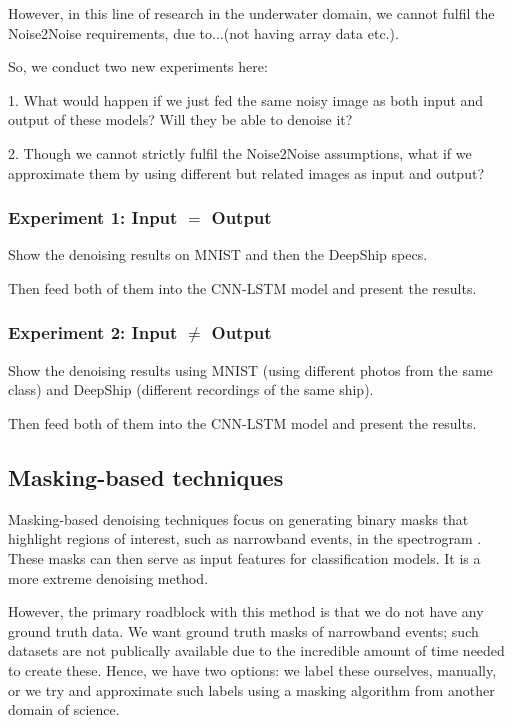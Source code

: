 However, in this line of research in the underwater domain, we cannot fulfil the Noise2Noise requirements, due to...(not having array data etc.). 

So, we conduct two new experiments here:

1. What would happen if we just fed the same noisy image as both input and output of these models? Will they be able to denoise it?

2. Though we cannot strictly fulfil the Noise2Noise assumptions, what if we approximate them by using different but related images as input and output?

\subsubsection{Experiment 1: Input $=$ Output}

Show the denoising results on MNIST and then the DeepShip specs.

Then feed both of them into the CNN-LSTM model and present the results.

\subsubsection{Experiment 2: Input $\neq$ Output}

Show the denoising results using MNIST (using different photos from the same class) and DeepShip (different recordings of the same ship).

Then feed both of them into the CNN-LSTM model and present the results.


\subsection{Masking-based techniques}

Masking-based denoising techniques focus on generating binary masks that highlight regions of interest, such as narrowband events, in the spectrogram \cite{zhou_self-noise_2023}. These masks can then serve as input features for classification models. It is a more extreme denoising method.

However, the primary roadblock with this method is that we do not have any ground truth data. We want ground truth masks of narrowband events; such datasets are not publically available due to the incredible amount of time needed to create these. Hence, we have two options: we label these ourselves, manually, or we try and approximate such labels using a masking algorithm from another domain of science.

